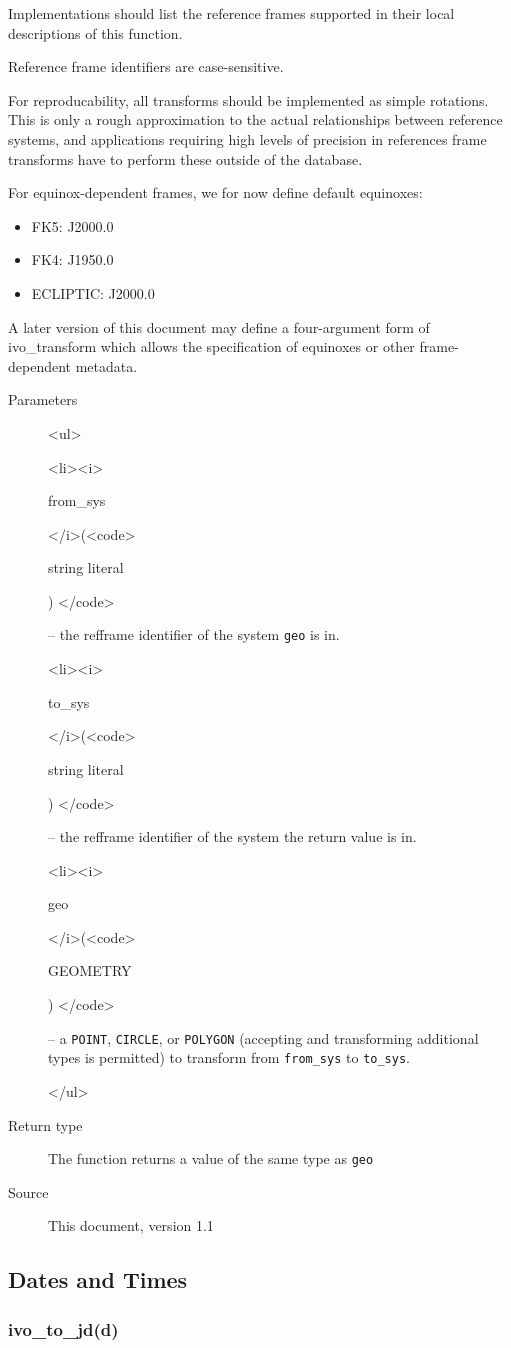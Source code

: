 \documentclass[11pt,a4paper]{ivoa}
\newenvironment{args}%
{\begin{html}<ul>\end{html}\def\arg##1(##2){\begin{html}<li><i>\end{html}%
  ##1 \begin{html}</i>(<code>\end{html}##2\begin{html}) </code>\end{html}}}%
{\begin{html}</ul>\end{html}}
\begin{document}
Implementations should list the reference frames supported in their
local descriptions of this function.

Reference frame identifiers are case-sensitive.

For reproducability, all transforms should be implemented as simple
rotations. This is only a rough approximation to the actual
relationships between reference systems, and applications requiring high
levels of precision in references frame transforms have to perform these
outside of the database.

For equinox-dependent frames, we for now define default equinoxes:

\begin{itemize}
\item FK5: J2000.0
\item FK4: J1950.0
\item ECLIPTIC: J2000.0
\end{itemize}

A later version of this document may define a four-argument form of
ivo\_transform which allows the specification of equinoxes or other
frame-dependent metadata.

\begin{description}
\item[Parameters]
\begin{args}
\arg from\_sys (string literal) -- the refframe identifier of the system
\verb|geo| is in.
\arg to\_sys (string literal) -- the refframe identifier of the system
the return value is in.
\arg geo (GEOMETRY) -- a \verb|POINT|, \verb|CIRCLE|, or \verb|POLYGON|
(accepting and transforming additional types is permitted)  to transform
from \verb|from_sys| to \verb|to_sys|.
\end{args}

\item[Return type] The function returns a value of the same type as
\verb|geo|

\item[Source] This document, version 1.1
\end{description}

\subsection{Dates and Times}

\subsubsection{ivo\_to\_jd(d)}
\end{document}
